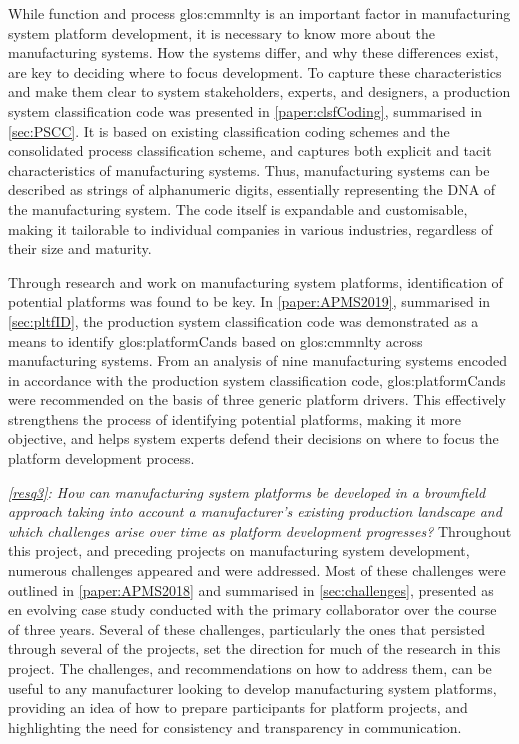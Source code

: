 While function and process \gls{glos:cmmnlty} is an important factor in manufacturing system platform development, it is necessary to know more about the manufacturing systems.
How the systems differ, and why these differences exist, are key to deciding where to focus development.
To capture these characteristics and make them clear to system stakeholders, experts, and designers, a production system classification code was presented in \cref{paper:clsfCoding}, summarised in \cref{sec:PSCC}.
It is based on existing classification coding schemes and the consolidated process classification scheme, and captures both explicit and tacit characteristics of manufacturing systems.
Thus, manufacturing systems can be described as strings of alphanumeric digits, essentially representing the DNA of the manufacturing system.
The code itself is expandable and customisable, making it tailorable to individual companies in various industries, regardless of their size and maturity.

Through research and work on manufacturing system platforms, identification of potential platforms was found to be key.
In \cref{paper:APMS2019}, summarised in \cref{sec:pltfID}, the production system classification code was demonstrated as a means to identify \gls{glos:platformCand}s based on \gls{glos:cmmnlty} across manufacturing systems.
From an analysis of nine manufacturing systems encoded in accordance with the production system classification code, \gls{glos:platformCand}s were recommended on the basis of three generic platform drivers.
This effectively strengthens the process of identifying potential platforms, making it more objective, and helps system experts defend their decisions on where to focus the platform development process.

\emph{\cref{resq3}: How can manufacturing system platforms be developed in a brownfield approach taking into account a manufacturer's existing production landscape and which challenges arise over time as platform development progresses?}
Throughout this \PhD{} project, and preceding projects on manufacturing system development, numerous challenges appeared and were addressed.
Most of these challenges were outlined in \cref{paper:APMS2018} and summarised in \cref{sec:challenges}, presented as en evolving case study conducted with the primary collaborator over the course of three years.
Several of these challenges, particularly the ones that persisted through several of the projects, set the direction for much of the research in this \PhD{} project.
The challenges, and recommendations on how to address them, can be useful to any manufacturer looking to develop manufacturing system platforms, providing an idea of how to prepare participants for platform projects, and highlighting the need for consistency and transparency in communication.

